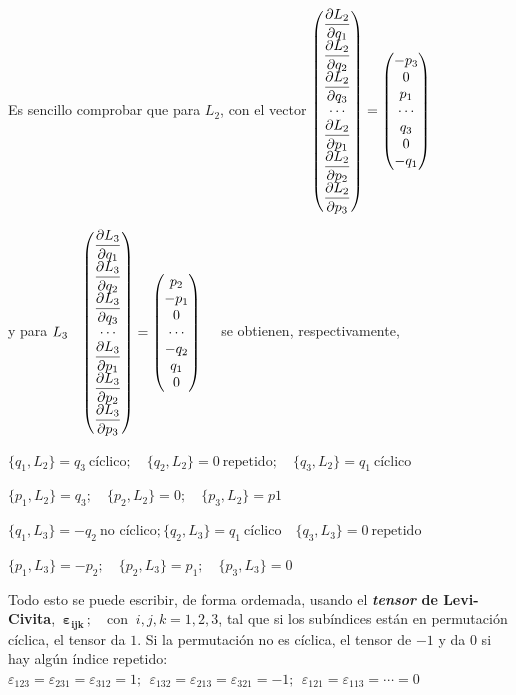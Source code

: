  Es sencillo comprobar que para $L_2$, con el vector 
 $\mqty( \displaystyle \pdv{L_2}{q_1} \\  \displaystyle \pdv{L_2}{q_2} \\  \displaystyle \pdv{L_2}{q_3} \\ \cdots \\  \displaystyle \pdv{L_2}{p_1} \\  \displaystyle \pdv{L_2}{p_2} \\   \displaystyle \pdv{L_2}{p_3}) = 
 \mqty( -p_3\\0\\p_1\\ \cdots\\ q_3\\0\\-q_1) \quad $  
 
 y para $L_3 \quad  \mqty( \displaystyle \pdv{L_3}{q_1} \\  \displaystyle \pdv{L_3}{q_2} \\  \displaystyle \pdv{L_3}{q_3} \\ \cdots \\  \displaystyle \pdv{L_3}{p_1} \\  \displaystyle \pdv{L_3}{p_2} \\   \displaystyle \pdv{L_3}{p_3}) = 
 \mqty( p_2\\-p_1\\0\\ \cdots\\ -q_2\\q_1\\0) \quad $ se obtienen, respectivamente,
 
 
\hspace{1cm} $\{q_1,L_2\}=q_3 \ \text{cíclico} ;\quad \{q_2,L_2\}=0 \ \text{repetido};\quad \{q_3,L_2\}=q_1 \ \text{cíclico}$

\hspace{1cm} $\{p_1,L_2\}=q_3;\quad \{p_2,L_2\}=0;\quad \{p_3,L_2\}=p1 $

\hspace{1cm} $\{q_1,L_3\}=-q_2 \ \text{no cíclico}; \{q_2,L_3\}=q_1 \ \text{cíclico} \quad \{q_3,L_3\}=0 \ \text{repetido}$

\hspace{1cm} $\{p_1,L_3\}=-p_2;\quad \{p_2,L_3\}=p_1;\quad \{p_3,L_3\}=0$

\vspace{5mm} Todo esto se puede escribir, de forma ordemada, usando el \textbf{\emph{tensor} de Levi-Civita}, $\ \boldsymbol{ \varepsilon_{ijk} }\, ;  \quad  \text{con } \ i,j,k=1,2,3$, tal que si los subíndices están en permutación cíclica, el tensor da $1$. Si la permutación no es cíclica, el tensor de $-1$ y da $0$ si hay algún índice repetido: $\varepsilon_{123}=\varepsilon_{231}=\varepsilon_{312}=1;\ \ \varepsilon_{132}=\varepsilon_{213}=\varepsilon_{321}=-1 ; \ \ \varepsilon_{121}=\varepsilon_{113}=\cdots =0$


